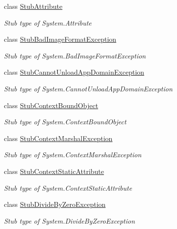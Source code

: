 \begin{DoxyCompactItemize}
class \hyperlink{class_system_1_1_fakes_1_1_stub_attribute}{Stub\-Attribute}
\begin{DoxyCompactList}\small\item\em Stub type of System.\-Attribute\end{DoxyCompactList}\item 
class \hyperlink{class_system_1_1_fakes_1_1_stub_bad_image_format_exception}{Stub\-Bad\-Image\-Format\-Exception}
\begin{DoxyCompactList}\small\item\em Stub type of System.\-Bad\-Image\-Format\-Exception\end{DoxyCompactList}\item 
class \hyperlink{class_system_1_1_fakes_1_1_stub_cannot_unload_app_domain_exception}{Stub\-Cannot\-Unload\-App\-Domain\-Exception}
\begin{DoxyCompactList}\small\item\em Stub type of System.\-Cannot\-Unload\-App\-Domain\-Exception\end{DoxyCompactList}\item 
class \hyperlink{class_system_1_1_fakes_1_1_stub_context_bound_object}{Stub\-Context\-Bound\-Object}
\begin{DoxyCompactList}\small\item\em Stub type of System.\-Context\-Bound\-Object\end{DoxyCompactList}\item 
class \hyperlink{class_system_1_1_fakes_1_1_stub_context_marshal_exception}{Stub\-Context\-Marshal\-Exception}
\begin{DoxyCompactList}\small\item\em Stub type of System.\-Context\-Marshal\-Exception\end{DoxyCompactList}\item 
class \hyperlink{class_system_1_1_fakes_1_1_stub_context_static_attribute}{Stub\-Context\-Static\-Attribute}
\begin{DoxyCompactList}\small\item\em Stub type of System.\-Context\-Static\-Attribute\end{DoxyCompactList}\item 
class \hyperlink{class_system_1_1_fakes_1_1_stub_divide_by_zero_exception}{Stub\-Divide\-By\-Zero\-Exception}
\begin{DoxyCompactList}\small\item\em Stub type of System.\-Divide\-By\-Zero\-Exception\end{DoxyCompactList}\item 

\end{DoxyCompactItemize}
